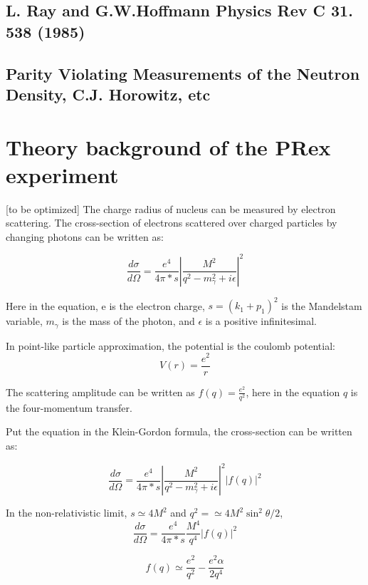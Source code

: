 \subsection{L. Ray and G.W.Hoffmann Physics Rev C 31. 538 (1985)}
\subsection{ Parity Violating Measurements of the Neutron Density, C.J. Horowitz, etc}

\section{Theory background of the PRex experiment}
[to be optimized]
The charge radius of nucleus can be measured by electron scattering. The cross-section of electrons scattered over charged particles by changing photons can be written as:

\begin{equation}
    \frac{d\sigma}{d\Omega} = \frac{e^4}{4\pi*s}|\frac{M^2}{q^2 - m^2_\gamma + i\epsilon}|^2
\end{equation}

Here in the equation,  e is the electron charge, $s = (k_1 + p_1)^2$ is the Mandelstam variable, $m_\gamma$ is the mass of the photon, and $\epsilon$ is a positive infinitesimal. 

In point-like particle approximation, the potential is the coulomb potential: 
\begin{equation}
    V(r) = \frac{e^2}{r}
\end{equation}

The scattering amplitude can be written as $f(q) = \frac{e^2}{q^2}$, here in the equation $q$ is the four-momentum transfer.

Put the equation in the Klein-Gordon formula, the cross-section can be written as:

\begin{equation}
     \frac{d\sigma}{d\Omega} = \frac{e^4}{4\pi*s}|\frac{M^2}{q^2 - m^2_\gamma + i\epsilon}|^2|f(q)|^2
\end{equation}

In the non-relativistic limit, $s \simeq 4M^2$ and $q^2 = \simeq 4M^2 \sin^2{\theta/2}$, 
\begin{equation}
    \frac{d\sigma}{d\Omega} = \frac{e^4}{4\pi*s} \frac{M^4}{q^4}|f(q)|^2
\end{equation}

\begin{equation}
    f(q) \simeq \frac{e^2}{q^2} - \frac{e^2\alpha}{2q^4}
\end{equation}

